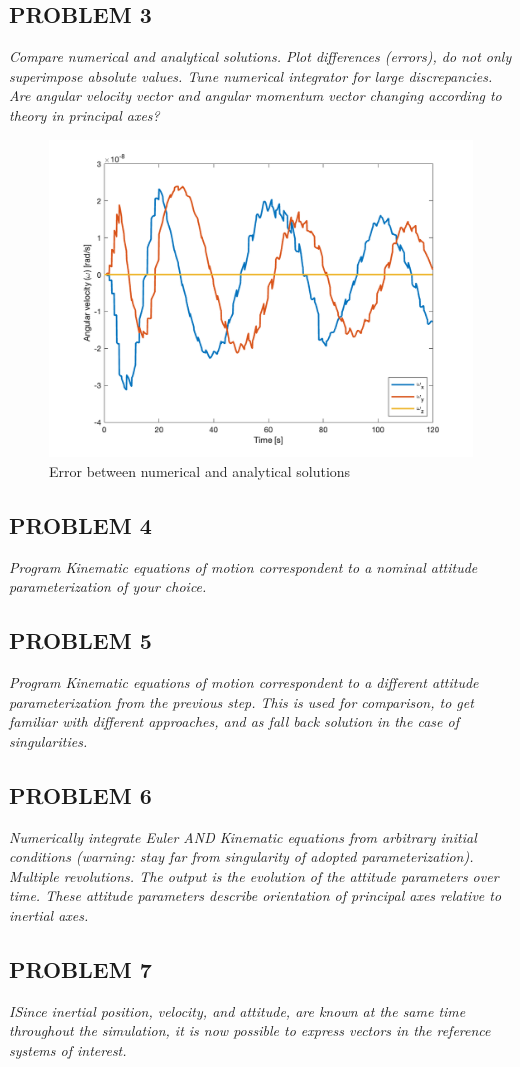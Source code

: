 \subsection{PROBLEM 3}
\textit{Compare numerical and analytical solutions. Plot differences (errors), do not only superimpose absolute values. Tune numerical integrator for large discrepancies. Are angular velocity vector and angular momentum vector changing according to theory in principal axes?}

\begin{figure}[H]
\centering
\includegraphics[scale=0.6]{Images/ps3_problem3.png}
\caption{Error between numerical and analytical solutions}
\label{fig:ps3_problem3}
\end{figure}


\subsection{PROBLEM 4}
\textit{Program Kinematic equations of motion correspondent to a nominal attitude parameterization of your choice.}


\subsection{PROBLEM 5}
\textit{Program Kinematic equations of motion correspondent to a different attitude parameterization from the previous step. This is used for comparison, to get familiar with different approaches, and as fall back solution in the case of singularities.}


\subsection{PROBLEM 6}
\textit{Numerically integrate Euler AND Kinematic equations from arbitrary initial conditions (warning: stay far from singularity of adopted parameterization). Multiple revolutions. The output is the evolution of the attitude parameters over time. These attitude parameters describe orientation of principal axes relative to inertial axes.}


\subsection{PROBLEM 7}
\textit{ISince inertial position, velocity, and attitude, are known at the same time throughout the simulation, it is now possible to express vectors in the reference systems of interest.}

